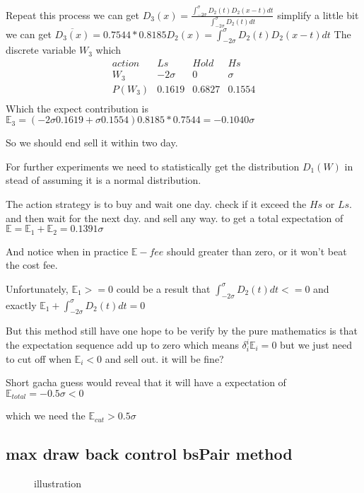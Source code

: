 \documentclass{article}
\theoremstyle{definition} %
\begin{document}
Repeat this process we can get
$D_3(x)=
    \frac{\int_{-2\sigma}^{\sigma}D_2(t)D_2(x-t)dt}
    {\int_{-2\sigma}^{\sigma}D_2(t)dt}$
simplify a little bit we can get
$\overline{D_3(x)}=0.7544*0.8185D_2(x)=
    \int_{-2\sigma}^{\sigma}D_2(t)D_2(x-t)dt$
The discrete variable $W_3$ which
$$
    \begin{array}{c|ccc}
        action & Ls       & Hold   & Hs     \\
        W_3    & -2\sigma & 0      & \sigma \\
        \hline
        P(W_3) & 0.1619   & 0.6827 & 0.1554 \\
    \end{array}
$$
Which the expect contribution is
$\mathbb{E}_3
    =(-2\sigma0.1619+\sigma0.1554)0.8185*0.7544
    =-0.1040\sigma$

So we should end sell it within two day.

For further experiments we need to statistically
get the distribution $D_1(W)$ in stead of
assuming it is a normal distribution.

The action strategy is to buy and wait one day.
check if it exceed the $Hs$ or $Ls$.
and then wait for the next day.
and sell any way.
to get a total expectation of
$\mathbb{E}
    =\mathbb{E}_1+\mathbb{E}_2
    =0.1391\sigma$

And notice when in practice
$\mathbb{E}-fee$ should greater than zero, or
it won't beat the cost fee.

Unfortunately,
$\mathbb{E}_1>=0$
could be a result that
$\int_{-2\sigma}^{\sigma}D_2(t)dt<=0$
and
exactly
$\mathbb{E}_1+\int_{-2\sigma}^{\sigma}D_2(t)dt=0$

But this method still have one hope to be
verify by the pure mathematics
is that
the expectation sequence
add up to zero
which means
$\delta_i^i\mathbb{E}_i=0$
but we just need to cut off when
$\mathbb{E}_i<0$ and sell out. it will be fine?

Short gacha guess would reveal
that it will have a expectation of
$\mathbb{E}_{total}=-0.5\sigma<0$

which we need the
$\mathbb{E}_{cut}>0.5\sigma$

\subsection[bsPair]{max draw back control bsPair method}
\begin{figure}[!ht]
    \centering
    \caption{illustration}
    \label{fig:bsPair}
\end{figure}
\end{document}
